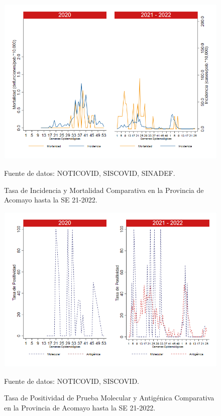 \documentclass[12pt,a4paper,openany]{book}
\begin{document}
	\begin{figure}[h]
		\caption{Tasa de Incidencia y Mortalidad Comparativa en la Provincia de Acomayo hasta la SE 21-2022.}\label{fig:inc_mort_acomayo}
		\begin{center}
			\includegraphics[width=0.70\linewidth]{../figuras/incidencia_mortalidad_20_21_1.png}
		\end{center}
		{\footnotesize {Fuente de datos: NOTICOVID, SISCOVID, SINADEF.}}
	\end{figure}
	
	\begin{figure}[h]
		\caption{Tasa de Positividad de Prueba Molecular y Antigénica Comparativa en la Provincia de Acomayo hasta la SE 21-2022. }\label{fig:positividad_acomayo}
		\begin{center}
			\includegraphics[width=0.7\linewidth]{../figuras/positividad_20_21_1.png}
		\end{center}
		{\footnotesize {Fuente de datos: NOTICOVID, SISCOVID.}}
	\end{figure}
	
\end{document}
